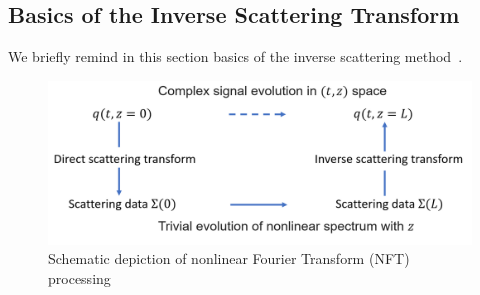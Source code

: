 \subsection{Basics of the Inverse Scattering Transform }
We briefly remind in this section basics of the inverse scattering method~\cite{ZakharovShabat1972}.




\begin{figure}[!bp]
	\centering
	\includegraphics[width=0.7\linewidth]{images/window/IST_scheme.png}
	\caption{Schematic depiction of nonlinear Fourier Transform (NFT) processing}
	\label{fig:IST}
\end{figure}

